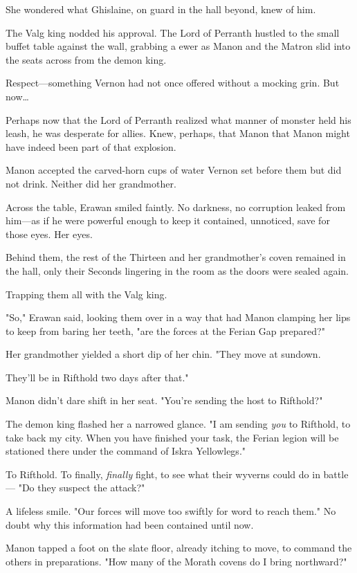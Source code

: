 She wondered what Ghislaine, on guard in the hall beyond, knew of him.

The Valg king nodded his approval. The Lord of Perranth hustled to the small buffet table against the wall, grabbing a ewer as Manon and the Matron slid into the seats across from the demon king.

Respect---something Vernon had not once offered without a mocking grin. But now\ldots{}

Perhaps now that the Lord of Perranth realized what manner of monster held his leash, he was desperate for allies. Knew, perhaps, that Manon
 that Manon might have indeed been part of that explosion.

Manon accepted the carved-horn cups of water Vernon set before them but did not drink. Neither did her grandmother.

Across the table, Erawan smiled faintly. No darkness, no corruption leaked from him---as if he were powerful enough to keep it contained, unnoticed, save for those eyes. Her eyes.

Behind them, the rest of the Thirteen and her grandmother's coven remained in the hall, only their Seconds lingering in the room as the doors were sealed again.

Trapping them all with the Valg king.

"So," Erawan said, looking them over in a way that had Manon clamping her lips to keep from baring her teeth, "are the forces at the Ferian Gap prepared?"

Her grandmother yielded a short dip of her chin. "They move at sundown.

They'll be in Rifthold two days after that."

Manon didn't dare shift in her seat. "You're sending the host to Rifthold?"

The demon king flashed her a narrowed glance. "I am sending \emph{you}
to Rifthold, to take back my city. When you have finished your task, the Ferian legion will be stationed there under the command of Iskra Yellowlegs."

To Rifthold. To finally, \emph{finally} fight, to see what their wyverns could do in battle--- "Do they suspect the attack?"

A lifeless smile. "Our forces will move too swiftly for word to reach them." No doubt why this information had been contained until now.

Manon tapped a foot on the slate floor, already itching to move, to command the others in preparations. "How many of the Morath covens do I bring northward?"

